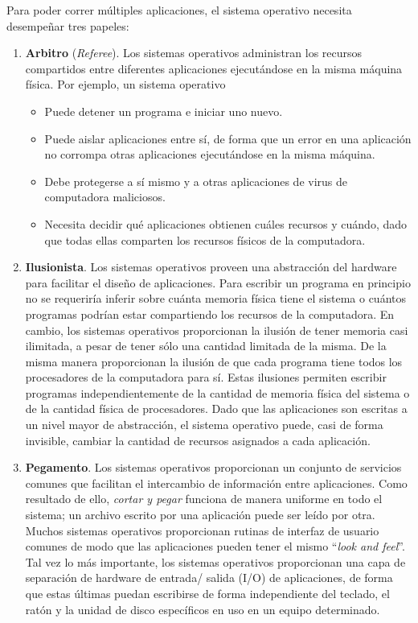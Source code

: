 \documentclass[10pt]{book}
\begin{document}
Para poder correr múltiples aplicaciones, el sistema operativo necesita desempeñar tres papeles:
\begin{enumerate}
\item \textbf{Arbitro} (\textit{Referee}). Los sistemas operativos administran los recursos compartidos entre diferentes aplicaciones ejecutándose en la misma máquina física. Por ejemplo, un sistema operativo
	\begin{itemize}
	\item Puede detener un programa e iniciar uno nuevo.
	\item Puede aislar aplicaciones entre sí, de forma que un error en una aplicación no corrompa otras aplicaciones ejecutándose en la misma máquina.
	\item Debe protegerse a sí mismo y a otras aplicaciones de virus de computadora maliciosos.
	\item Necesita decidir qué aplicaciones obtienen cuáles recursos y cuándo, dado que todas ellas comparten los recursos físicos de la computadora. 
	\end{itemize}
	
\item \textbf{Ilusionista}. Los sistemas operativos proveen una abstracción del hardware para facilitar el diseño de aplicaciones. Para escribir un programa en principio no se requeriría inferir sobre cuánta memoria física tiene el sistema o cuántos programas podrían estar compartiendo los recursos de la computadora. En cambio, los sistemas operativos proporcionan la ilusión de tener memoria casi ilimitada, a pesar de tener sólo una cantidad limitada de la misma. De la misma manera proporcionan la ilusión de que cada programa tiene todos los procesadores de la computadora para sí. Estas ilusiones permiten escribir programas independientemente de la cantidad de memoria física del sistema o de la cantidad física de procesadores. Dado que las aplicaciones son escritas a un nivel mayor de abstracción, el sistema operativo puede, casi de forma invisible, cambiar la cantidad de recursos asignados a cada aplicación.

\item \textbf{Pegamento}. Los sistemas operativos proporcionan un conjunto de servicios comunes que facilitan el intercambio de información entre aplicaciones. Como resultado de ello, \textit{cortar y pegar} funciona de manera uniforme en todo el sistema; un archivo escrito por una aplicación puede ser leído por otra. Muchos sistemas operativos proporcionan rutinas de interfaz de usuario comunes de modo que las aplicaciones pueden tener el mismo ``\textit{look and feel}''. Tal vez lo más importante, los sistemas operativos proporcionan una capa de separación de hardware de entrada/ salida (I/O) de aplicaciones, de forma que estas últimas puedan escribirse de forma independiente del teclado, el ratón y la unidad de disco específicos en uso en un equipo determinado.
\end{enumerate}
\end{document}

